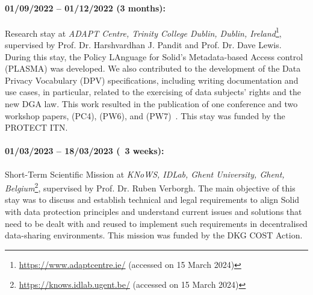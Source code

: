 \paragraph{01/09/2022 -- 01/12/2022 (3 months):} Research stay at \textit{ADAPT Centre, Trinity College Dublin, Dublin, Ireland}\footnote{\url{https://www.adaptcentre.ie/} (accessed on 15 March 2024)}, supervised by Prof. Dr. Harshvardhan J. Pandit and Prof. Dr. Dave Lewis. During this stay, the Policy LAnguage for Solid’s Metadata-based Access control (PLASMA) was developed. We also contributed to the development of the Data Privacy Vocabulary (DPV) specifications, including writing documentation and use cases, in particular, related to the exercising of data subjects' rights and the new DGA law. This work resulted in the publication of one conference and two workshop papers, (PC4), (PW6), and (PW7)~\citep{esteves_semantics_2023,esteves_towards_2023,esteves_using_2023}. This stay was funded by the PROTECT ITN.

\paragraph{01/03/2023 -- 18/03/2023 (~3 weeks):} Short-Term Scientific Mission at \textit{KNoWS, IDLab, Ghent University, Ghent, Belgium}\footnote{\url{https://knows.idlab.ugent.be/} (accessed on 15 March 2024)}, supervised by Prof. Dr. Ruben Verborgh. The main objective of this stay was to discuss and establish technical and legal requirements to align Solid with data protection principles and understand current issues and solutions that need to be dealt with and reused to implement such requirements in decentralised data-sharing environments. This mission was funded by the DKG COST Action.